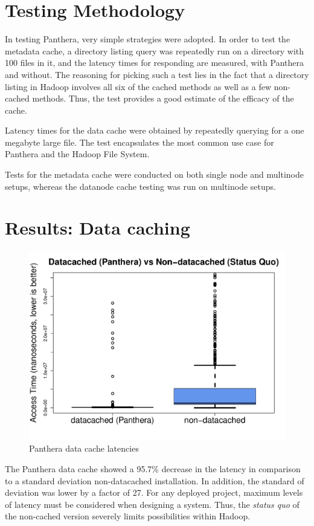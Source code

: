 \documentclass[12pt]{article}
\begin{document}
\section{Testing Methodology}

In testing Panthera, very simple strategies were adopted. In order to test the metadata cache, a directory listing query was repeatedly run on a directory with 100 files in it, and the latency times for responding are measured, with Panthera and without. The reasoning for picking such a test lies in the fact that a directory listing in Hadoop involves all six of the cached methods as well as a few non-cached methods. Thus, the test provides a good estimate of the efficacy of the cache.

Latency times for the data cache were obtained by repeatedly querying for a one megabyte large file. The test encapsulates the most common use case for Panthera and the Hadoop File System.

Tests for the metadata cache were conducted on both single node and multinode setups, whereas the datanode cache testing was run on multinode setups.

\section{Results: Data caching}
\begin{figure}[!h]
	\caption{Panthera data cache latencies}
	\centering
		\includegraphics[scale=0.4]{assets/box-plot-data.pdf}
\end{figure}

The Panthera data cache showed a 95.7\% decrease in the latency in comparison to a standard deviation non-datacached installation. In addition, the standard of deviation was lower by a factor of 27. For any deployed project, maximum levels of latency must be considered when designing a system. Thus, the \textit{status quo} of the non-cached version severely limits possibilities within Hadoop.
\end{document}
